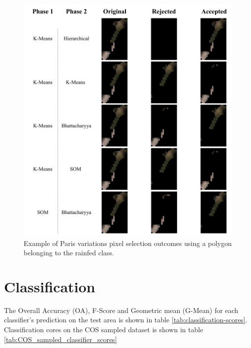 \documentclass[12pt, english, openany]{book}
\begin{document}
\begin{figure}[H]
  \centering
  \includegraphics[width=1\linewidth]{paris_variations_results.png}
  \caption[Example of Paris variations pixel selection outcomes.]
  {Example of Paris variations pixel selection outcomes using a polygon belonging
    to the rainfed class.}
  \label{fig:paris-variations-rainfed-example}
\end{figure}

\section{Classification}

The Overall Accuracy (OA), F-Score and Geometric mean (G-Mean) for each
classifier's prediction on the test area is shown in table
\ref{tab:classification-scores}. Classification cores on the COS sampled dataset is
shown in table \ref{tab:COS_sampled_classifier_scores}
\end{document}
